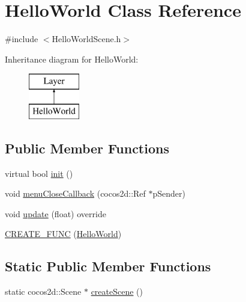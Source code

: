 \hypertarget{classHelloWorld}{\section{Hello\-World Class Reference}
\label{classHelloWorld}
}


{\ttfamily \#include $<$Hello\-World\-Scene.\-h$>$}

Inheritance diagram for Hello\-World\-:\begin{figure}[H]
\begin{center}
\leavevmode
\includegraphics[height=2.000000cm]{classHelloWorld}
\end{center}
\end{figure}
\subsection*{Public Member Functions}
\begin{DoxyCompactItemize}
\item 
virtual bool \hyperlink{classHelloWorld_a65e2b1525051f3690e5a39ca56608a97}{init} ()
\item 
void \hyperlink{classHelloWorld_ac4ab2f5e922e659d4f137591c0f6a9b0}{menu\-Close\-Callback} (cocos2d\-::\-Ref $\ast$p\-Sender)
\item 
void \hyperlink{classHelloWorld_acf5d9777877c1b475a6c4bc1c16fac8a}{update} (float) override
\item 
\hyperlink{classHelloWorld_a857ebfbc49f3a7f81772bee4991d186b}{C\-R\-E\-A\-T\-E\-\_\-\-F\-U\-N\-C} (\hyperlink{classHelloWorld}{Hello\-World})
\end{DoxyCompactItemize}
\subsection*{Static Public Member Functions}
\begin{DoxyCompactItemize}
\item 
static cocos2d\-::\-Scene $\ast$ \hyperlink{classHelloWorld_a1b700f5f9de04271533d3fa099d7b014}{create\-Scene} ()
\end{DoxyCompactItemize}


